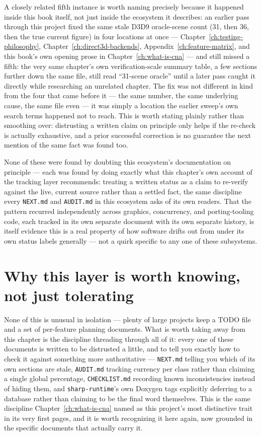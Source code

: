 A closely related fifth instance is worth naming precisely because it happened inside this book
itself, not just inside the ecosystem it describes: an earlier pass through this project fixed
the same stale D3D9 oracle-scene count (31, then 36, then the true current figure) in four
locations at once --- Chapter~\ref{ch:testing-philosophy}, Chapter~\ref{ch:direct3d-backends},
Appendix~\ref{ch:feature-matrix}, and this book's own opening prose in
Chapter~\ref{ch:what-is-cna} --- and still missed a fifth: the very same chapter's own
verification-scale summary table, a few sections further down the same file, still read
``31-scene oracle'' until a later pass caught it directly while researching an unrelated
chapter. The fix was not different in kind from the four that came before it --- the same
number, the same underlying cause, the same file even --- it was simply a location the earlier
sweep's own search terms happened not to reach. This is worth stating plainly rather than
smoothing over: distrusting a written claim on principle only helps if the re-check is
actually exhaustive, and a prior successful correction is no guarantee the next mention of the
same fact was found too.

None of these were found by doubting this ecosystem's documentation on principle --- each was
found by doing exactly what this chapter's own account of the tracking layer recommends:
treating a written status as a claim to re-verify against the live, current source rather than
a settled fact, the same discipline every \texttt{NEXT.md} and \texttt{AUDIT.md} in this
ecosystem asks of its own readers. That the pattern recurred independently across graphics,
concurrency, and porting-tooling code, each tracked in its own separate document with its own
separate history, is itself evidence this is a real property of how software drifts out from
under its own status labels generally --- not a quirk specific to any one of these subsystems.

\section{Why this layer is worth knowing, not just tolerating}

None of this is unusual in isolation --- plenty of large projects keep a TODO file and a set
of per-feature planning documents. What is worth taking away from this chapter is the
discipline threading through all of it: every one of these documents is written to be
distrusted a little, and to tell you exactly how to check it against something more
authoritative --- \texttt{NEXT.md} telling you which of its own sections are stale,
\texttt{AUDIT.md} tracking currency per class rather than claiming a single global percentage,
\texttt{CHECKLIST.md} recording known inconsistencies instead of hiding them, and
\texttt{sharp-runtime}'s own Doxygen tags explicitly deferring to a database rather than
claiming to be the final word themselves. This is the same discipline
Chapter~\ref{ch:what-is-cna} named as this project's most distinctive trait in its very first
pages, and it is worth recognizing it here again, now grounded in the specific documents that
actually carry it.
